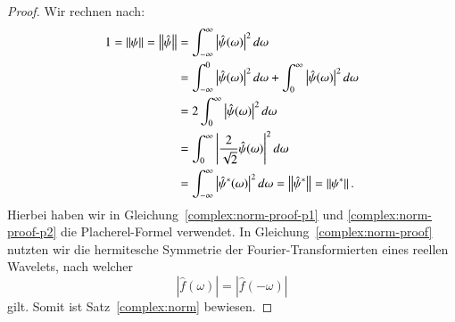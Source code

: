 \begin{proof}
	Wir rechnen nach:
	\begin{align}
		1 = \left\|\psi\right\| = \left\|\hat{\psi}\right\| 
		&= \int_{-\infty}^{\infty}\left|\hat{\psi}(\omega)\right|^2 d\omega \label{complex:norm-proof-p1}\\
		&= \int_{-\infty}^{0}\left|\hat{\psi}(\omega)\right|^2 d\omega +  \int_{0}^{\infty}\left|\hat{\psi}(\omega)\right|^2 d\omega \notag\\
		&=  2\int_{0}^{\infty}\left|\hat{\psi}(\omega)\right|^2 d\omega \label{complex:norm-proof}\\
		&=  \int_{0}^{\infty}\left|\frac{2}{\sqrt{2}}\hat{\psi}(\omega)\right|^2 d\omega \notag\\
		&=  \int_{-\infty}^{\infty}\left|\hat{\psi}^\ast(\omega)\right|^2 d\omega 
		= \left\|\hat{\psi}^\ast\right\| = \left\|\psi^\ast\right\|.\label{complex:norm-proof-p2}
	\end{align}
	Hierbei haben wir in Gleichung~\eqref{complex:norm-proof-p1} und \eqref{complex:norm-proof-p2} die Placherel-Formel verwendet.
	In Gleichung~\eqref{complex:norm-proof} nutzten wir die hermitesche Symmetrie der Fourier-Transformierten eines reellen Wavelets, nach welcher
	\[\left|\hat{f}(\omega)\right| = \left|\hat{f}(-\omega)\right|\]
	gilt.
	Somit ist Satz~\ref{complex:norm} bewiesen.
\end{proof}
